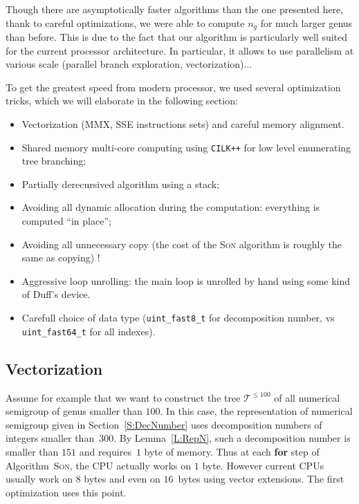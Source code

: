 \documentclass[reqno,11pt]{amsart}
\theoremstyle{plain}
\theoremstyle{definition}
\renewcommand{\leq}{\leqslant}
\begin{document}
\label{S:Opti}

Though there are asymptotically faster algorithms than the one presented here,
thank to careful optimizations, we were able to compute $n_g$ for much larger
genus than before. This is due to the fact that our algorithm is particularly
well suited for the current processor architecture. In particular, it allows
to use parallelism at various scale (parallel branch exploration,
vectorization)...

To get the greatest speed from modern processor, we used several optimization
tricks, which we will elaborate in the following section:
\begin{itemize}
\item Vectorization (MMX, SSE instructions sets) and careful memory alignment.
\item Shared memory multi-core computing using \texttt{CILK++} for low level
  enumerating tree branching;
\item Partially derecursived algorithm using a stack;
\item Avoiding all dynamic allocation during the computation: everything is
  computed ``in place'';
\item Avoiding all unnecessary copy (the cost of the \textsc{Son} algorithm is
  roughly the same as copying) !
\item Aggressive loop unrolling: the main loop is unrolled by hand using some
  kind of Duff's device.
\item Carefull choice of data type (\verb|uint_fast8_t| for decomposition
  number, vs \verb|uint_fast64_t| for all indexes).
\end{itemize}

\subsection{Vectorization}

Assume for example that we want to construct the tree $\mathcal{T}^{\leq 100}$
of all numerical semigroup of genus smaller than $100$.  In this case, the
representation of numerical semigroup given in Section~\ref{S:DecNumber} uses
decomposition numbers of integers smaller than~$300$.  By Lemma~\ref{L:RepN},
such a decomposition number is smaller than $151$ and requires~$1$ byte of
memory.  Thus at each \textbf{for} step of Algorithm~\textsc{Son}, the CPU
actually works on $1$ byte. However current CPUs usually work on $8$ bytes and
even on $16$~bytes using vector extensions. The first optimization uses this
point.
\end{document}
